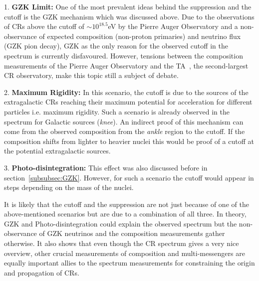 1. \textbf{GZK Limit:} One of the most prevalent ideas behind the suppression and the cutoff is the GZK mechanism which was discussed above. Due to the observations of \glspl{CR} above the cutoff of $\sim 10^{18.5}$eV by the Pierre Auger Observatory and a non-observance of expected composition (non-proton primaries) and neutrino flux (GZK pion decay), GZK as the only reason for the observed cutoff in the spectrum is currently disfavoured. However, tensions between the composition measurements of the Pierre Auger Observatory and the \gls{TA}~\cite{kawai2008telescope}, the second-largest \gls*{CR} observatory, make this topic still a subject of debate.

2. \textbf{Maximum Rigidity:} In this scenario, the cutoff is due to the sources of the extragalactic \glspl{CR} reaching their maximum potential for acceleration for different particles i.e. maximum rigidity. Such a scenario is already observed in the spectrum for Galactic sources (\textit{knee}). An indirect proof of this mechanism can come from the observed composition from the \textit{ankle} region to the cutoff. If the composition shifts from lighter to heavier nuclei this would be proof of a cutoff at the potential extragalactic sources. 

3. \textbf{Photo-disintegration:} This effect was also discussed before in section~\ref{subsubsec:GZK}. However, for such a scenario the cutoff would appear in steps depending on the mass of the nuclei. 

It is likely that the cutoff and the suppression are not just because of one of the above-mentioned scenarios but are due to a combination of all three. In theory, \gls{GZK} and Photo-disintegration could explain the observed spectrum but the non-observance of \gls*{GZK} neutrinos and the composition measurements gather otherwise. It also shows that even though the CR spectrum gives a very nice overview, other crucial measurements of composition and multi-messengers are equally important allies to the spectrum measurements for constraining the origin and propagation of \glspl{CR}.

